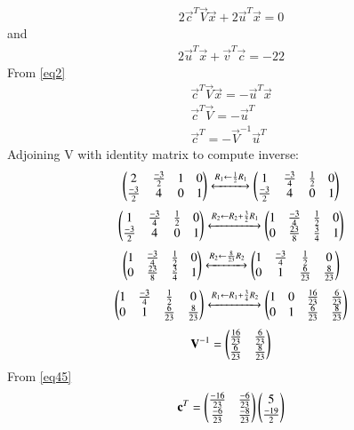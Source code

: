 \documentclass[journal,12pt,twocolumn]{IEEEtran}
\begin{document}
\begin{align}\label{eq2}
2\vec{c}^T\vec{V}\vec{x}+2\vec{u}^T\vec{x}=0
\end{align}
and
\begin{align}
2\vec{u}^T\vec{x}+\vec{v}^T\vec{c}=-22
\end{align}
From \eqref{eq2}
\begin{align}
\vec{c}^T\vec{V}\vec{x}= -\vec{u}^T\vec{x}\\
\vec{c}^T\vec{V}= -\vec{u}^T\\
\vec{c}^T= -\vec{V}^{-1}\vec{u}^T \label{eq45}
\end{align}
 Adjoining  \vec V with identity matrix to compute inverse:
\begin{align}
\begin{pmatrix}
2 &  \frac{-3}{2} &1 &0\\
 \frac{-3}{2} &4 & 0&1
\end{pmatrix}
  \xleftrightarrow[]{R_1 \leftarrow  \frac{1}{2}R_1}
\begin{pmatrix}
1& \frac{-3}{4}&  \frac{1}{2}  &0\\
 \frac{-3}{2} &4 & 0 &1
\end{pmatrix}
\end{align}
\begin{align}
\begin{pmatrix}
1& \frac{-3}{4}&  \frac{1}{2}  &0\\
 \frac{-3}{2} &4 & 0 &1
\end{pmatrix}
  \xleftrightarrow[]{R_2 \leftarrow R_2+\frac{3}{2} R_1}
\begin{pmatrix}
1& \frac{-3}{4}& \frac{1}{2} &0\\
0 & \frac{23}{8} & \frac{3}{4} & 1\end{pmatrix}
\end{align}
\begin{align}
\begin{pmatrix}
1& \frac{-3}{4}& \frac{1}{2} &0\\
0 & \frac{23}{8} & \frac{3}{4} & 1\end{pmatrix}
  \xleftrightarrow[]{R_2 \leftarrow\frac{8}{23}  R_2}
\begin{pmatrix}
1& \frac{-3}{4}& \frac{1}{2} &0\\
0 & 1 & \frac{6}{23} &\frac{8}{23} \end{pmatrix}
\end{align}
\begin{align}
\begin{pmatrix}
1& \frac{-3}{4}& \frac{1}{2} &0\\
0 & 1 & \frac{6}{23} &\frac{8}{23} \end{pmatrix}
  \xleftrightarrow[]{R_1 \leftarrow R_1+\frac{3}{4}R_2}
\begin{pmatrix}
1& 0& \frac{16}{23} &\frac{6}{23}\\
0 & 1 & \frac{6}{23} &\frac{8}{23} \end{pmatrix}
\end{align}
\begin{align}
\mathbf V^{-1}=
\begin{pmatrix}
\frac{16}{23} & \frac{6}{23}\\
\frac{6}{23}&\frac{8}{23}\end{pmatrix}
\end{align}
From \eqref{eq45}
\begin{align}
\mathbf{c}^T=
\begin{pmatrix}
\frac{-16}{23} &\frac{-6}{23}\\
\frac{-6}{23}& \frac{-8}{23}
\end{pmatrix}
\begin{pmatrix}
5 \\\frac{-19}{2}
\end{pmatrix}
\end{align}
\end{document}
